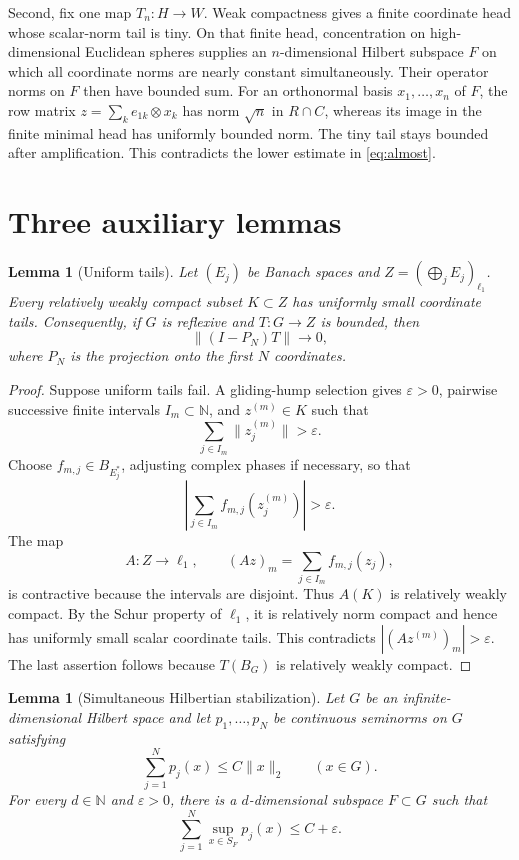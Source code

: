 \documentclass[11pt]{article}
\newtheorem{lemma}[theorem]{Lemma}
\begin{document}
Second, fix one map $T_n:H\to W$.  Weak compactness gives a finite coordinate
head whose scalar-norm tail is tiny.  On that finite head, concentration on
high-dimensional Euclidean spheres supplies an $n$-dimensional Hilbert
subspace $F$ on which all coordinate norms are nearly constant
simultaneously.  Their operator norms on $F$ then have bounded sum.  For an
orthonormal basis $x_1,\ldots,x_n$ of $F$, the row matrix
$z=\sum_k e_{1k}\otimes x_k$ has norm $\sqrt n$ in $R\cap C$, whereas its
image in the finite minimal head has uniformly bounded norm.  The tiny tail
stays bounded after amplification.  This contradicts the lower estimate in
\eqref{eq:almost}.

\section{Three auxiliary lemmas}

\begin{lemma}[Uniform tails]\label{lem:tails}
Let $(E_j)$ be Banach spaces and
$Z=(\bigoplus_jE_j)_{\ell_1}$.  Every relatively weakly compact subset
$K\subset Z$ has uniformly small coordinate tails.  Consequently, if $G$ is
reflexive and $T:G\to Z$ is bounded, then
\[
 \|(I-P_N)T\|\longrightarrow0,
\]
where $P_N$ is the projection onto the first $N$ coordinates.
\end{lemma}

\begin{proof}
Suppose uniform tails fail.  A gliding-hump selection gives $\varepsilon>0$,
pairwise successive finite intervals $I_m\subset\mathbb N$, and $z^{(m)}\in K$
such that
\[
 \sum_{j\in I_m}\|z^{(m)}_j\|>\varepsilon.
\]
Choose $f_{m,j}\in B_{E_j^*}$, adjusting complex phases if necessary, so that
\[
 \left|\sum_{j\in I_m}f_{m,j}(z^{(m)}_j)\right|>\varepsilon.
\]
The map
\[
 A:Z\to\ell_1,
 \qquad
 (Az)_m=\sum_{j\in I_m}f_{m,j}(z_j),
\]
is contractive because the intervals are disjoint.  Thus $A(K)$ is relatively
weakly compact.  By the Schur property of $\ell_1$, it is relatively norm
compact and hence has uniformly small scalar coordinate tails.  This
contradicts $|(Az^{(m)})_m|>\varepsilon$.  The last assertion follows because
$T(B_G)$ is relatively weakly compact.
\end{proof}

\begin{lemma}[Simultaneous Hilbertian stabilization]\label{lem:stabilize}
Let $G$ be an infinite-dimensional Hilbert space and let
$p_1,\ldots,p_N$ be continuous seminorms on $G$ satisfying
\[
 \sum_{j=1}^Np_j(x)\leq C\|x\|_2\qquad(x\in G).
 \tag{2}\label{eq:seminormbound}
\]
For every $d\in\mathbb N$ and $\varepsilon>0$, there is a $d$-dimensional
subspace $F\subset G$ such that
\[
 \sum_{j=1}^N\sup_{x\in S_F}p_j(x)\leq C+\varepsilon.
 \tag{3}\label{eq:stabilized}
\]
\end{lemma}
\end{document}
